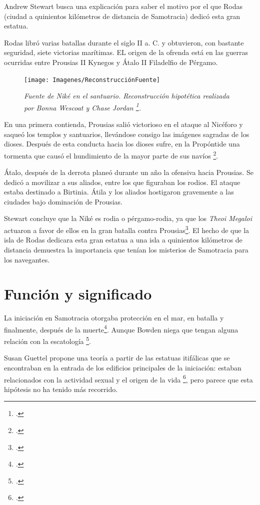 Andrew Stewart busca una explicación para saber el motivo por el que Rodas (ciudad a quinientos kilómetros de distancia de Samotracia) dedicó esta gran estatua. 

Rodas libró varias batallas durante el siglo II a. C. y obtuvieron, con bastante seguridad, siete victorias marítimas. EL origen de la ofrenda está en las guerras ocurridas entre Prousias II Kynegos y Átalo II Filadelfio de Pérgamo. 

\begin{figure}[h!]
	\centering
	\texttt{[image: Imagenes/ReconstrucciónFuente]}
	\caption{\textit{Fuente de Niké en el santuario. Reconstrucción hipotética realizada por Bonna Wescoat y Chase Jordan \footcite[401]{stewartNikeSamothraceAnother2016}.}}
	\label{fig:fuente-nike}
\end{figure}

En una primera contienda, Prousias salió victorioso en el ataque al Nicéforo y saqueó los templos y santuarios, llevándose consigo las imágenes sagradas de los dioses. Después de esta conducta hacia los dioses sufre, en la Propóntide una tormenta que causó el hundimiento de la mayor parte de sus navíos \footcite[404]{stewartNikeSamothraceAnother2016}.

Átalo, después de la derrota planeó durante un año la ofensiva hacia Prousias. Se dedicó a movilizar a sus aliados, entre los que figuraban los rodios. El ataque estaba destinado a Birtinia. Átila y los aliados hostigaron gravemente a las ciudades bajo dominación de Prousias.

Stewart concluye que la Niké es rodia o pérgamo-rodia, ya que los \textit{Theoi Megaloi }actuaron a favor de ellos en la gran batalla contra Prousias\footcite[405]{stewartNikeSamothraceAnother2016}. El hecho de que la isla de Rodas dedicara esta gran estatua a una isla a quinientos kilómetros de distancia demuestra la importancia que tenían los misterios de Samotracia para los navegantes.


\section{Función y significado}

La iniciación en Samotracia otorgaba protección en el mar, en batalla y finalmente, después de la muerte\footcite[6]{guettelcoleTheoiMegaloiCult1984}. Aunque Bowden niega que tengan alguna relación con la escatología \footcite[82]{bowdenMysteryCultsAncient2023}.

Susan Guettel propone una teoría a partir de las estatuas itifálicas que se encontraban en la entrada de los edificios principales de la iniciación: estaban relacionados con la actividad sexual y el origen de la vida \footcite[29]{guettelcoleTheoiMegaloiCult1984}, pero parece que esta hipótesis no ha tenido más recorrido. 

